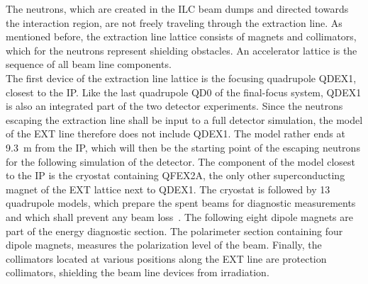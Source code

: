 The neutrons, which are created in the ILC beam dumps and directed towards the interaction region, are not freely traveling through the extraction line.
As mentioned before, the extraction line lattice consists of magnets and collimators, which for the neutrons represent shielding obstacles.
An accelerator lattice is the sequence of all beam line components.
\\The first device of the extraction line lattice is the focusing quadrupole QDEX1, closest to the IP.
Like the last quadrupole QD0 of the final-focus system, QDEX1 is also an integrated part of the two detector experiments.
Since the neutrons escaping the extraction line shall be input to a full detector simulation, the \fluka model of the EXT line therefore does not include QDEX1.
The model rather ends at \SI{9.3}{\meter} from the IP, which will then be the starting point of the escaping neutrons for the following \geant simulation of the \sid detector.
The component of the \fluka model closest to the IP is the cryostat containing QFEX2A, the only other superconducting magnet of the EXT lattice next to QDEX1.
The cryostat is followed by 13 quadrupole models, which prepare the spent beams for diagnostic measurements and which shall prevent any beam loss~\cites[p. 139 ff]{TDR32}{EXT_design, EXT_design2}.
The following eight dipole magnets are part of the energy diagnostic section.
The polarimeter section containing four dipole magnets, measures the polarization level of the beam.
Finally, the collimators located at various positions along the EXT line are protection collimators, shielding the beam line devices from irradiation.
